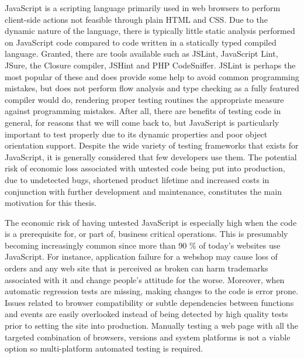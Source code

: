 \documentclass[11pt]{article}
\begin{document}
JavaScript is a scripting language primarily used in web browsers to perform client-side actions not feasible through plain HTML and CSS. Due to the dynamic nature of the language, there is typically little static analysis performed on JavaScript code compared to code written in a statically typed compiled language. Granted, there are tools available such as JSLint, JavaScript Lint, JSure, the Closure compiler, JSHint and PHP CodeSniffer. JSLint is perhaps the most popular of these and does provide some help to avoid common programming mistakes, but does not perform flow analysis\cite{JSLint} and type checking as a fully featured compiler would do, rendering proper testing routines the appropriate measure against programming mistakes. After all, there are benefits of testing code in general, for reasons that we will come back to, but JavaScript is particularly important to test properly due to its dynamic properties and poor object orientation support. Despite the wide variety of testing frameworks that exists for JavaScript, it is generally considered that few\cite{TestingStatistics} developers use them. The potential risk of economic loss associated with untested code being put into production, due to undetected bugs, shortened product lifetime and increased costs in conjunction with further development and maintenance, constitutes the main motivation for this thesis.

The economic risk of having untested JavaScript is especially high when the code is a prerequisite for, or part of, business critical operations. This is presumably becoming increasingly common since more than 90 \% of today's websites use JavaScript\cite{BusinessJavascript}. For instance, application failure for a webshop may cause loss of orders and any web site that is perceived as broken can harm trademarks associated with it and change people's attitude for the worse. Moreover, when automatic regression tests are missing, making changes to the code is error prone. Issues related to browser compatibility or subtle dependencies between functions and events are easily overlooked instead of being detected by high quality tests prior to setting the site into production. Manually testing a web page with all the targeted combination of browsers, versions and system platforms is not a viable option\cite{TestSwarm} so multi-platform automated testing is required.
\end{document}
